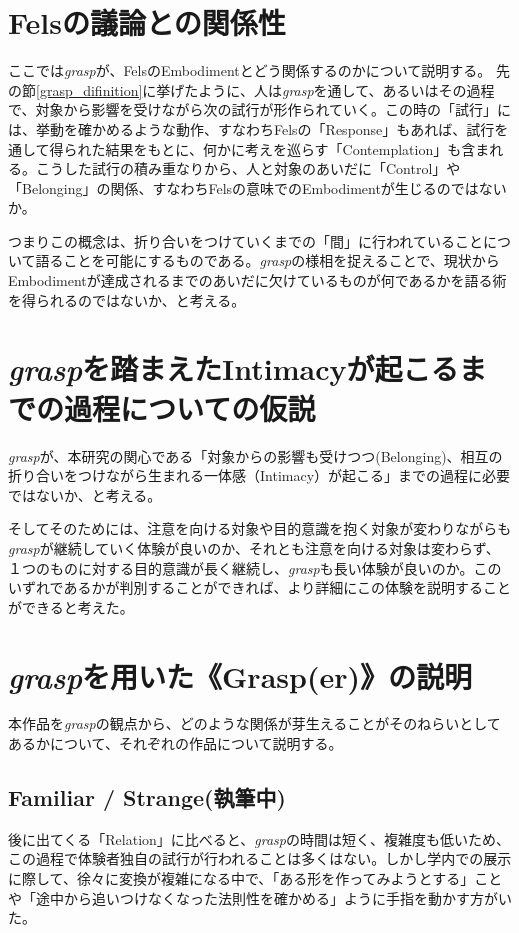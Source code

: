 \section{Felsの議論との関係性}
ここでは\textit{grasp}が、FelsのEmbodimentとどう関係するのかについて説明する。
先の節\ref{grasp_difinition}に挙げたように、人は\textit{grasp}を通して、あるいはその過程で、対象から影響を受けながら次の試行が形作られていく。この時の「試行」には、挙動を確かめるような動作、すなわちFelsの「Response」もあれば、試行を通して得られた結果をもとに、何かに考えを巡らす「Contemplation」も含まれる。こうした試行の積み重なりから、人と対象のあいだに「Control」や「Belonging」の関係、すなわちFelsの意味でのEmbodimentが生じるのではないか。

つまりこの概念は、折り合いをつけていくまでの「間」に行われていることについて語ることを可能にするものである。\textit{grasp}の様相を捉えることで、現状からEmbodimentが達成されるまでのあいだに欠けているものが何であるかを語る術を得られるのではないか、と考える。

\section{\textit{grasp}を踏まえたIntimacyが起こるまでの過程についての仮説}
\textit{grasp}が、本研究の関心である「対象からの影響も受けつつ(Belonging)、相互の折り合いをつけながら生まれる一体感（Intimacy）が起こる」までの過程に必要ではないか、と考える。

そしてそのためには、注意を向ける対象や目的意識を抱く対象が変わりながらも\textit{grasp}が継続していく体験が良いのか、それとも注意を向ける対象は変わらず、１つのものに対する目的意識が長く継続し、\textit{grasp}も長い体験が良いのか。このいずれであるかが判別することができれば、より詳細にこの体験を説明することができると考えた。

\section{\textit{grasp}を用いた《Grasp(er)》の説明}
本作品を\textit{grasp}の観点から、どのような関係が芽生えることがそのねらいとしてあるかについて、それぞれの作品について説明する。

\subsection*{Familiar / Strange(執筆中)}
後に出てくる「Relation」に比べると、\textit{grasp}の時間は短く、複雑度も低いため、この過程で体験者独自の試行が行われることは多くはない。しかし学内での展示に際して、徐々に変換が複雑になる中で、「ある形を作ってみようとする」ことや「途中から追いつけなくなった法則性を確かめる」ように手指を動かす方がいた。

